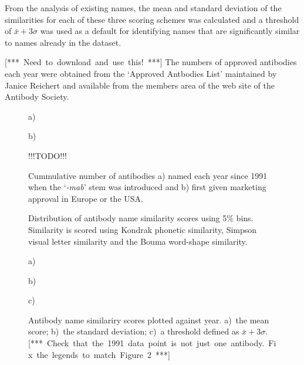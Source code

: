 \documentclass{article}
\newcommand{\eg}[1]{\mbox{`\emph{#1}'}}
\newcommand{\note}[1]{\mbox{\color{red}[*** #1 ***]}}
\begin{document}
From the analysis of existing names, the mean and standard deviation
of the similarities for each of these three scoring schemes was
calculated and a threshold of $\bar{x} + 3\sigma$ was used as a
default for identifying names that are significantly similar to names
already in the dataset.

\note{Need to download and use this!}  The numbers of approved
antibodies each year were obtained from the `Approved Antbodies List'
maintained by Janice Reichert and available from the members area of
the web site of the Antibody Society.


\begin{figure}
  \noindent a)
  

  \noindent b)

  !!!TODO!!!
  
  \caption{\label{fig:namesandapproved}Cummulative number of antibodies
  a) named each year since 1991 when the \eg{-mab} stem was introduced and
  b) first given marketing approval in Europe or the USA.}
\end{figure}



\begin{figure}
\begin{center}
\end{center}
 \caption{\label{fig:distrib} Distribution of antibody name similarity
   scores using 5\% bins. Similarity is scored using Kondrak phonetic
   similarity, Simpson visual letter similarity and the Bouma
   word-shape similarity.}
\end{figure}



\begin{figure}
  \noindent a)

\begin{center}
\end{center}

  \noindent b)

\begin{center}
\end{center}

  \noindent c)

\begin{center}
\end{center}

  
  \caption{\label{fig:results} Antibody name similariry
    scores plotted against year. a)~the mean score; b)~the standard
    deviation; c)~a threshold defined as
    $\bar{x}+3\sigma$. \note{Check that the 1991 data point is not
      just one antibody. Fix the legends to match Figure~2}}
\end{figure}
\end{document}
